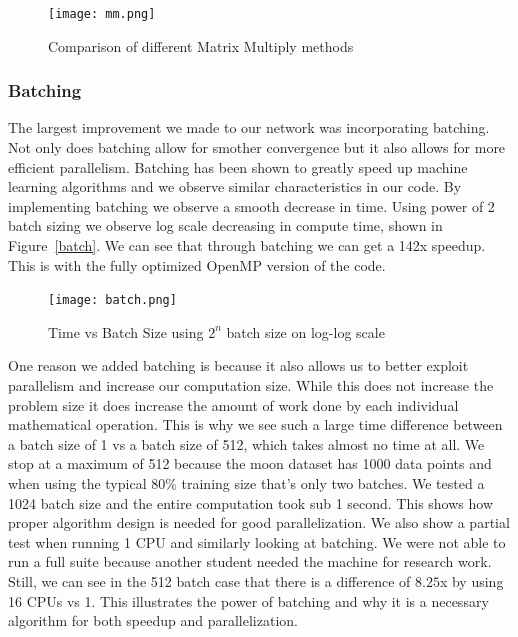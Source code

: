 \begin{figure}[ht]
\centering
\texttt{[image: mm.png]}
\caption{Comparison of different Matrix Multiply methods}
    \label{fig:mm}
\end{figure}

\subsubsection{Batching}

The largest improvement we made to our network was incorporating batching. Not
only does batching allow for smother convergence but it also allows for more
efficient parallelism. Batching has been shown to greatly speed up machine
learning algorithms and we observe similar characteristics in our code. By
implementing batching we observe a smooth decrease in time. Using power of 2
batch sizing we observe log scale decreasing in compute time, shown in
Figure~\ref{batch}. We can see that through batching we can get a 142x speedup.
This is with the fully optimized OpenMP version of the code. 

\begin{figure}[ht]
\centering
\texttt{[image: batch.png]}
\caption{Time vs Batch Size using $2^n$ batch size on log-log scale}
    \label{fig:batch}
\end{figure}

One reason we added batching is because it also allows us to better exploit
parallelism and increase our computation size. While this does not increase the
problem size it does increase the amount of work done by each individual
mathematical operation. This is why we see such a large time difference between
a batch size of 1 vs a batch size of 512, which takes almost no time at all. We
stop at a maximum of 512 because the moon dataset has 1000 data points and when
using the typical 80\% training size that's only two batches. We tested a 1024
batch size and the entire computation took sub 1 second. This shows how proper
algorithm design is needed for good parallelization. We also show a partial test
when running 1 CPU and similarly looking at batching. We were not able to run a
full suite because another student needed the machine for research work. Still,
we can see in the 512 batch case that there is a difference of $8.25$x by using
16 CPUs vs 1. This illustrates the power of batching and why it is a necessary
algorithm for both speedup and parallelization.

